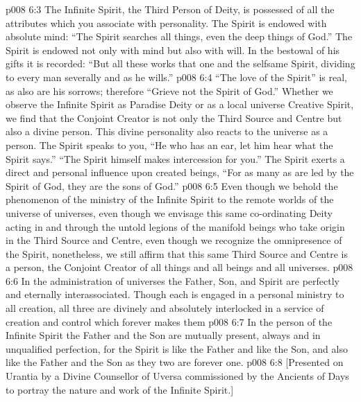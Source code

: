 \vs p008 6:3 The Infinite Spirit, the Third Person of Deity, is possessed of all the attributes which you associate with personality. The Spirit is endowed with absolute mind: “The Spirit searches all things, even the deep things of God.” The Spirit is endowed not only with mind but also with will. In the bestowal of his gifts it is recorded: “But all these works that one and the selfsame Spirit, dividing to every man severally and as he wills.”
\vs p008 6:4 “The love of the Spirit” is real, as also are his sorrows; therefore “Grieve not the Spirit of God.” Whether we observe the Infinite Spirit as Paradise Deity or as a local universe Creative Spirit, we find that the Conjoint Creator is not only the Third Source and Centre but also a divine person. This divine personality also reacts to the universe as a person. The Spirit speaks to you, “He who has an ear, let him hear what the Spirit says.” “The Spirit himself makes intercession for you.” The Spirit exerts a direct and personal influence upon created beings, “For as many as are led by the Spirit of God, they are the sons of God.”
\vs p008 6:5 Even though we behold the phenomenon of the ministry of the Infinite Spirit to the remote worlds of the universe of universes, even though we envisage this same co\hyp{}ordinating Deity acting in and through the untold legions of the manifold beings who take origin in the Third Source and Centre, even though we recognize the omnipresence of the Spirit, nonetheless, we still affirm that this same Third Source and Centre is a person, the Conjoint Creator of all things and all beings and all universes.
\vs p008 6:6 \pc In the administration of universes the Father, Son, and Spirit are perfectly and eternally interassociated. Though each is engaged in a personal ministry to all creation, all three are divinely and absolutely interlocked in a service of creation and control which forever makes them 
\vs p008 6:7 In the person of the Infinite Spirit the Father and the Son are mutually present, always and in unqualified perfection, for the Spirit is like the Father and like the Son, and also like the Father and the Son as they two are forever one.
\vsetoff
\vs p008 6:8 [Presented on Urantia by a Divine Counsellor of Uversa commissioned by the Ancients of Days to portray the nature and work of the Infinite Spirit.]
\quizlink
